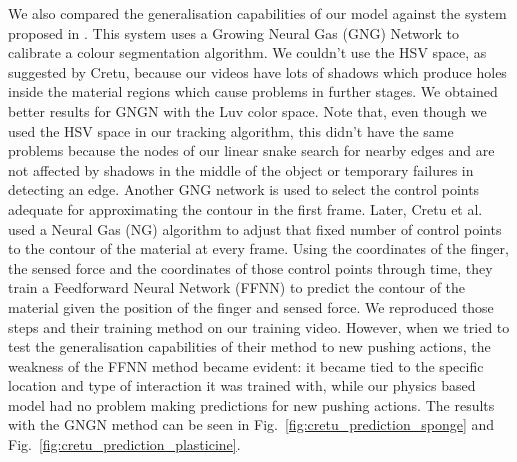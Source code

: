 \documentclass[journal]{IEEEtran}
\newcommand{\fref}[1]{Fig.~\ref{#1}}
\newcounter{algorithm}
\begin{document}
We also compared the generalisation capabilities of our model against the system proposed in \cite{Cretu2012}.  This system uses a Growing Neural Gas (GNG) Network to calibrate a colour segmentation algorithm.  We couldn't use the HSV space, as suggested by Cretu, because our videos have lots of shadows which produce holes inside the material regions which cause problems in further stages.  We obtained better results for GNGN with the Luv color space.  Note that, even though we used the HSV space in our tracking algorithm, this didn't have the same problems because the nodes of our linear snake search for nearby edges and are not affected by shadows in the middle of the object or temporary failures in detecting an edge.  Another GNG network is used to select the control points adequate for approximating the contour in the first frame.  Later, Cretu et al. used a Neural Gas (NG) algorithm to adjust that fixed number of control points to the contour of the material at every frame.  Using the coordinates of the finger, the sensed force and the coordinates of those control points through time, they train a Feedforward Neural Network (FFNN) to predict the contour of the material given the position of the finger and sensed force.  We reproduced those steps and their training method on our training video.  However, when we tried to test the generalisation capabilities of their method to new pushing actions, the weakness of the FFNN method became evident: it became tied to the specific location and type of interaction it was trained with, while our physics based model had no problem making predictions for new pushing actions.  The results with the GNGN method can be seen in \fref{fig:cretu_prediction_sponge} and \fref{fig:cretu_prediction_plasticine}.
\end{document}
